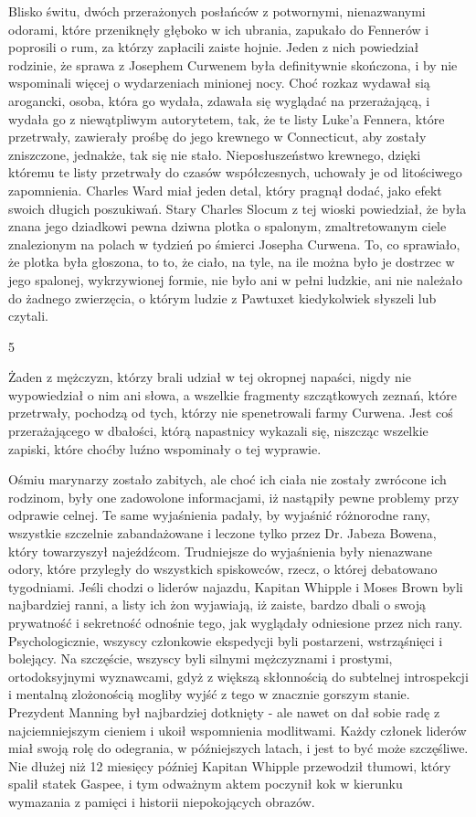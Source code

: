 Blisko świtu, dwóch przerażonych posłańców z potwornymi, nienazwanymi odorami, które przeniknęły głęboko w ich ubrania, zapukało do Fennerów i poprosili o rum, za którzy zapłacili zaiste hojnie. Jeden z nich powiedział rodzinie, że sprawa z Josephem Curwenem była definitywnie skończona, i by nie wspominali więcej o wydarzeniach minionej nocy. Choć rozkaz wydawał sią arogancki, osoba, która go wydała, zdawała się wyglądać na przerażającą, i wydała go z niewątpliwym autorytetem, tak, że te listy Luke'a Fennera, które przetrwały, zawierały prośbę do jego krewnego w Connecticut, aby zostały zniszczone, jednakże, tak się nie stało. Nieposłuszeństwo krewnego, dzięki któremu te listy przetrwały do czasów współczesnych, uchowały je od litościwego zapomnienia. Charles Ward miał jeden detal, który pragnął dodać, jako efekt swoich długich poszukiwań. Stary Charles Slocum z tej wioski powiedział, że była znana jego dziadkowi pewna dziwna plotka o spalonym, zmaltretowanym ciele znalezionym na polach w tydzień po śmierci Josepha Curwena. To, co sprawiało, że plotka była głoszona, to to, że ciało, na tyle, na ile można było je dostrzec w jego spalonej, wykrzywionej formie, nie było ani w pełni ludzkie, ani nie należało do żadnego zwierzęcia, o którym ludzie z Pawtuxet kiedykolwiek słyszeli lub czytali.

\begin{center}
5
\end{center}

Żaden z mężczyzn, którzy brali udział w tej okropnej napaści, nigdy nie wypowiedział o nim ani słowa, a wszelkie fragmenty szczątkowych zeznań, które przetrwały, pochodzą od tych, którzy nie spenetrowali farmy Curwena. Jest coś przerażającego w dbałości, którą napastnicy wykazali się, niszcząc wszelkie zapiski, które choćby luźno wspominały o tej wyprawie. 

Ośmiu marynarzy zostało zabitych, ale choć ich ciała nie zostały zwrócone ich rodzinom, były one zadowolone informacjami, iż nastąpiły pewne problemy przy odprawie celnej. Te same wyjaśnienia padały, by wyjaśnić różnorodne rany, wszystkie szczelnie zabandażowane i leczone tylko przez Dr. Jabeza Bowena, który towarzyszył najeźdźcom. Trudniejsze do wyjaśnienia były nienazwane odory, które przyległy do wszystkich spiskowców, rzecz, o której debatowano tygodniami. Jeśli chodzi o liderów najazdu, Kapitan Whipple i Moses Brown byli najbardziej ranni, a listy ich żon wyjawiają, iż zaiste, bardzo dbali o swoją prywatność i sekretność odnośnie tego, jak wyglądały odniesione przez nich rany. Psychologicznie, wszyscy członkowie ekspedycji byli postarzeni, wstrząśnięci i bolejący. Na szczęście, wszyscy byli silnymi mężczyznami i prostymi, ortodoksyjnymi wyznawcami, gdyż z większą skłonnością do subtelnej introspekcji i mentalną zlożonością mogliby wyjść z tego w znacznie gorszym stanie. Prezydent Manning był najbardziej dotknięty - ale nawet on dał sobie radę z najciemniejszym cieniem i ukoił wspomnienia modlitwami. Każdy członek liderów miał swoją rolę do odegrania, w późniejszych latach, i jest to być może szczęśliwe. Nie dłużej niż 12 miesięcy później Kapitan Whipple przewodził tłumowi, który spalił statek Gaspee, i tym odważnym aktem poczynił kok w kierunku wymazania z pamięci i historii niepokojących obrazów. 

